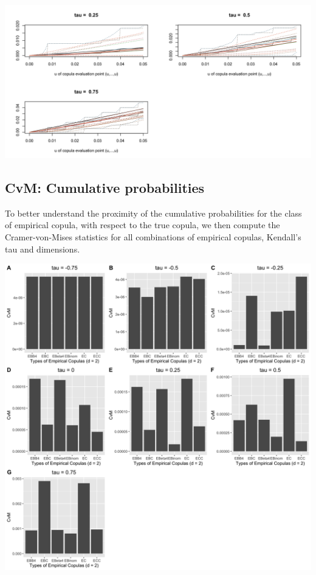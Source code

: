 \documentclass[12pt]{report}
\newcommand{\1}{\mathbf{1}}
\begin{document}
\begin{flushleft}
\begin{center}
\label{C_5d_c}
\includegraphics[width=17cm]{CumulativeProb/C_5d_c.png}
\end{center}%


\newpage
\subsection{CvM: Cumulative probabilities}
To better understand the proximity of the cumulative probabilities for the class of empirical copula, with respect to the true copula, we then compute the Cramer-von-Mises statistics for all combinations of empirical copulas, Kendall's tau and dimensions.

\begin{center}
\label{t4_2d_c_CvM}
\includegraphics[width=17cm]{CumulativeCvM/t4_2d_c_CvM.png}
\end{center}%


\end{flushleft}
\end{document}
